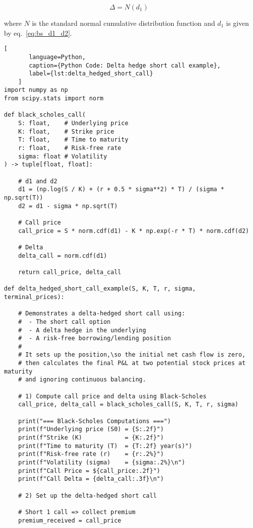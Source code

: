     \begin{equation}
        \Delta = N(d_1)
        \label{eq:delta_bs}
    \end{equation}

    where $N$ is the standard normal cumulative distribution function and $d_1$ is given by eq.~\ref{eq:bs_d1_d2}.

    \begin{lstlisting}[
       language=Python,
       caption={Python Code: Delta hedge short call example},
       label={lst:delta_hedged_short_call}
    ]
import numpy as np
from scipy.stats import norm

def black_scholes_call(
    S: float,    # Underlying price
    K: float,    # Strike price
    T: float,    # Time to maturity
    r: float,    # Risk-free rate
    sigma: float # Volatility
) -> tuple[float, float]:

    # d1 and d2
    d1 = (np.log(S / K) + (r + 0.5 * sigma**2) * T) / (sigma * np.sqrt(T))
    d2 = d1 - sigma * np.sqrt(T)

    # Call price
    call_price = S * norm.cdf(d1) - K * np.exp(-r * T) * norm.cdf(d2)

    # Delta
    delta_call = norm.cdf(d1)

    return call_price, delta_call

def delta_hedged_short_call_example(S, K, T, r, sigma, terminal_prices):

    # Demonstrates a delta-hedged short call using:
    #  - The short call option
    #  - A delta hedge in the underlying
    #  - A risk-free borrowing/lending position
    #
    # It sets up the position,\so the initial net cash flow is zero,
    # then calculates the final P&L at two potential stock prices at maturity
    # and ignoring continuous balancing.

    # 1) Compute call price and delta using Black-Scholes
    call_price, delta_call = black_scholes_call(S, K, T, r, sigma)

    print("=== Black-Scholes Computations ===")
    print(f"Underlying price (S0) = {S:.2f}")
    print(f"Strike (K)            = {K:.2f}")
    print(f"Time to maturity (T)  = {T:.2f} year(s)")
    print(f"Risk-free rate (r)    = {r:.2%}")
    print(f"Volatility (sigma)    = {sigma:.2%}\n")
    print(f"Call Price = ${call_price:.2f}")
    print(f"Call Delta = {delta_call:.3f}\n")

    # 2) Set up the delta-hedged short call

    # Short 1 call => collect premium
    premium_received = call_price


\end{lstlisting}
